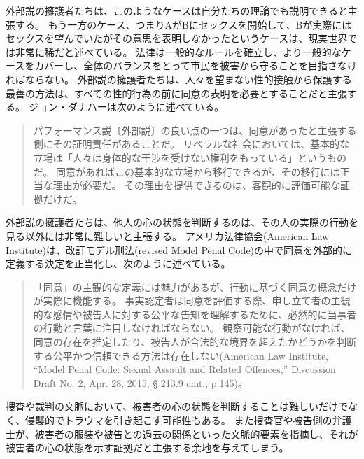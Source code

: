 \documentclass[paper=a4,book,openany]{jlreq}
\begin{document}
外部説の擁護者たちは、このようなケースは自分たちの理論でも説明できると主張する。
もう一方のケース、つまりAがBにセックスを開始して、Bが実際にはセックスを望んでいたがその意思を表明しなかったというケースは、現実世界では非常に稀だと述べている。
法律は一般的なルールを確立し、より一般的なケースをカバーし、全体のバランスをとって市民を被害から守ることを目指さなければならない。
外部説の擁護者たちは、人々を望まない性的接触から保護する最善の方法は、すべての性的行為の前に同意の表明を必要とすることだと主張する。
ジョン・ダナハーは次のように述べている。

\begin{quote}
  パフォーマンス説〔外部説〕の良い点の一つは、同意があったと主張する側にその証明責任があることだ。
リベラルな社会においては、基本的な立場は「人々は身体的な干渉を受けない権利をもっている」というものだ。
同意があればこの基本的な立場から移行できるが、その移行には正当な理由が必要だ。
その理由を提供できるのは、客観的に評価可能な証拠だけだ。
\citep{danaher13:_some_notes_consen_sexual_offen_part_one}
\end{quote}

外部説の擁護者たちは、他人の心の状態を判断するのは、その人の実際の行動を見る以外には非常に難しいと主張する。
アメリカ法律協会(American Law Institute)は、改訂モデル刑法(revised Model Penal Code)の中で同意を外部的に定義する決定を正当化し、次のように述べている。

\begin{quote}
「同意」の主観的な定義には魅力があるが、行動に基づく同意の概念だけが実際に機能する。
事実認定者は同意を評価する際、申し立て者の主観的な感情や被告人に対する公平な告知を理解するために、必然的に当事者の行動と言葉に注目しなければならない。
観察可能な行動がなければ、同意の存在を推定したり、被告人が合法的な境界を超えたかどうかを判断する公平かつ信頼できる方法は存在しない(American Law  Institute, ``Model Penal Code: Sexual Assault and Related Offences,'' Discussion Draft No. 2, Apr. 28, 2015, § 213.9 cmt., p.145)。
\end{quote}

捜査や裁判の文脈において、被害者の心の状態を判断することは難しいだけでなく、侵襲的でトラウマを引き起こす可能性もある。
また捜査官や被告側の弁護士が、被害者の服装や被告との過去の関係といった文脈的要素を指摘し、それが被害者の心の状態を示す証拠だと主張する余地を与えてしまう。
\end{document}
